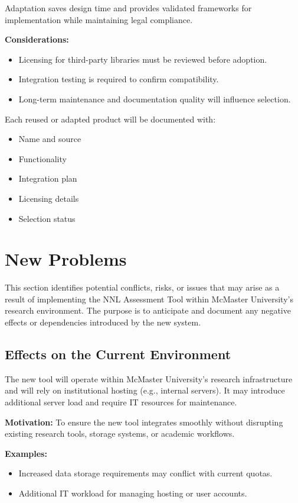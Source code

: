\documentclass[12pt]{article}
\begin{document}
Adaptation saves design time and provides validated frameworks for implementation while maintaining legal compliance.

\textbf{Considerations:}
\begin{itemize}
    \item Licensing for third-party libraries must be reviewed before adoption.
    \item Integration testing is required to confirm compatibility.
    \item Long-term maintenance and documentation quality will influence selection.
\end{itemize}

Each reused or adapted product will be documented with:
\begin{itemize}
    \item Name and source
    \item Functionality
    \item Integration plan
    \item Licensing details
    \item Selection status
\end{itemize}


\section{New Problems}

This section identifies potential conflicts, risks, or issues that may arise as a result of implementing the NNL Assessment Tool within McMaster University’s research environment. The purpose is to anticipate and document any negative effects or dependencies introduced by the new system.

\subsection{Effects on the Current Environment}

The new tool will operate within McMaster University’s research infrastructure and will rely on institutional hosting (e.g., internal servers). It may introduce additional server load and require IT resources for maintenance.

\textbf{Motivation:} To ensure the new tool integrates smoothly without disrupting existing research tools, storage systems, or academic workflows.

\textbf{Examples:}
\begin{itemize}
    \item Increased data storage requirements may conflict with current quotas.
    \item Additional IT workload for managing hosting or user accounts.
\end{itemize}
\end{document}

